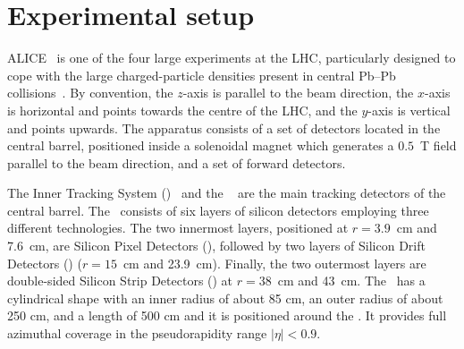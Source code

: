 \section{Experimental setup}
\label{Sec:ExpSetup}
ALICE~\cite{Aamodt:2008zz,Abelev:2014ffa} is one of the four large experiments at the LHC, particularly designed to cope with the large charged-particle densities present in central Pb--Pb collisions~\cite{Aamodt:2010pb}. By convention, the $z$-axis is parallel to the beam direction, the $x$-axis is horizontal and points towards the centre of the LHC, and the $y$-axis is vertical and points upwards. The apparatus consists of a set of detectors located in the central barrel, positioned inside a solenoidal magnet which generates a $0.5$~T field parallel to the beam direction, and a set of forward detectors. 

The Inner Tracking System (\ITS)~\cite{Aamodt:2008zz} and the \TPC~\cite{Alme:2010ke} are the main tracking detectors of the central barrel. The \ITS~consists of six layers of silicon detectors employing three different technologies. The two innermost layers, positioned at $r = 3.9$~cm and 7.6~cm,  are Silicon Pixel Detectors (\SPD), followed by two layers of Silicon Drift Detectors (\SDD) ($r = 15$~cm and 23.9~cm). Finally, the two outermost layers are double-sided Silicon Strip Detectors (\SSD) at $r = 38$~cm and 43~cm. The \TPC~has a cylindrical shape with an inner radius of about 85 cm, an outer radius of about 250 cm, and a length of 500 cm and it is positioned around the \ITS. It provides full azimuthal coverage in the pseudorapidity range $|\eta| < 0.9$. 

